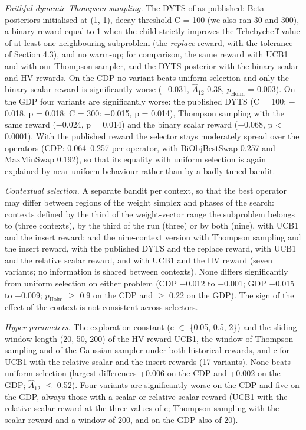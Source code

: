 \documentclass[final,3p,times,11pt,authoryear]{elsarticle}
\begin{document}
\emph{Faithful dynamic Thompson sampling.} The DYTS of \citet{sun2020} as published: Beta posteriors initialised at (1, 1), decay threshold C = 100 (we also ran 30 and 300), a binary reward equal to 1 when the child strictly improves the Tchebycheff value of at least one neighbouring subproblem (the \emph{replace} reward, with the tolerance of Section 4.3), and no warm-up; for comparison, the same reward with UCB1 and with our Thompson sampler, and the DYTS posterior with the binary scalar and HV rewards. On the CDP no variant beats uniform selection and only the binary scalar reward is significantly worse ($-$0.031, $\hat{A}_{12}$ 0.38, $p_{\mathrm{Holm}}$ = 0.003). On the GDP four variants are significantly worse: the published DYTS (C = 100: $-$0.018, p = 0.018; C = 300: $-$0.015, p = 0.014), Thompson sampling with the same reward ($-$0.024, p = 0.014) and the binary scalar reward ($-$0.068, p < 0.0001). With the published reward the selector stays moderately spread over the operators (CDP: 0.064--0.257 per operator, with BiObjBestSwap 0.257 and MaxMinSwap 0.192), so that its equality with uniform selection is again explained by near-uniform behaviour rather than by a badly tuned bandit.

\emph{Contextual selection.} A separate bandit per context, so that the best operator may differ between regions of the weight simplex and phases of the search: contexts defined by the third of the weight-vector range the subproblem belongs to (three contexts), by the third of the run (three) or by both (nine), with UCB1 and the insert reward; and the nine-context version with Thompson sampling and the insert reward, with the published DYTS and the replace reward, with UCB1 and the relative scalar reward, and with UCB1 and the HV reward (seven variants; no information is shared between contexts). None differs significantly from uniform selection on either problem (CDP $-$0.012 to $-$0.001; GDP $-$0.015 to $-$0.009; $p_{\mathrm{Holm}}$ $\geq$ 0.9 on the CDP and $\geq$ 0.22 on the GDP). The sign of the effect of the context is not consistent across selectors.

\emph{Hyper-parameters.} The exploration constant (c $\in$ \{0.05, 0.5, 2\}) and the sliding-window length (20, 50, 200) of the HV-reward UCB1, the window of Thompson sampling and of the Gaussian sampler under both historical rewards, and c for UCB1 with the relative scalar and the insert rewards (17 variants). None beats uniform selection (largest differences +0.006 on the CDP and +0.002 on the GDP; $\hat{A}_{12}$ $\leq$ 0.52). Four variants are significantly worse on the CDP and five on the GDP, always those with a scalar or relative-scalar reward (UCB1 with the relative scalar reward at the three values of c; Thompson sampling with the scalar reward and a window of 200, and on the GDP also of 20).
\end{document}
